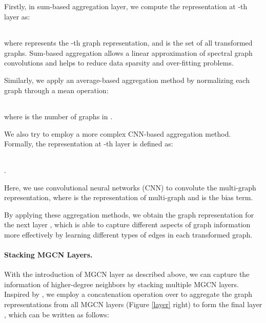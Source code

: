 \documentclass[11pt,a4paper]{article}
\begin{document}
Firstly, in sum-based aggregation layer, we compute the representation  at -th layer as:
\begin{center}
\begin{tabular}{c}
		
	\end{tabular}
\end{center}
where  represents the -th graph representation, and  is the set of all transformed graphs. 
Sum-based aggregation allows a linear approximation of spectral graph convolutions and helps to reduce data sparsity and over-fitting problems.

Similarly, we apply an average-based aggregation method by normalizing each graph through a mean operation:
\begin{center}
\begin{tabular}{c}
		
	\end{tabular}
\end{center}
where  is the number of graphs in .

We also try to employ a more complex CNN-based aggregation method. Formally, the representation  at -th layer is defined as:
\begin{center}
\begin{tabular}{c}
		
	\end{tabular}.
\end{center}

Here, we use convolutional neural networks (CNN) to convolute the multi-graph representation, where  is the representation of multi-graph and  is the bias term.

By applying these aggregation methods, we obtain the graph representation for the next layer , which is able to capture different aspects of graph information more effectively by learning different types of edges in each transformed graph.

\paragraph{Stacking MGCN Layers.}
With the introduction of MGCN layer as described above, we can capture the information of higher-degree neighbors by stacking multiple MGCN layers.
Inspired by \citet{xu2018representation}, we employ a concatenation operation over  to aggregate the graph representations from all MGCN layers (Figure \ref{layer} right) to form the final layer , which can be written as follows:
\begin{center}
\begin{tabular}{c}
		
	\end{tabular}
\end{center}
\end{document}
